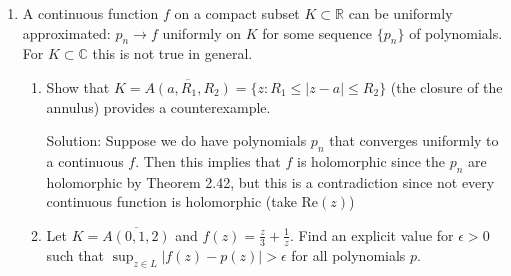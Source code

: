 \documentclass[11pt]{article}
\newcommand{\re}[0]{\text{Re}}
\newcommand{\C}{\mathbb{C}}
\newcommand{\R}{\mathbb{R}}
\begin{document}
\begin{enumerate}[(1)]
\item A continuous function $f$ on a compact subset $K \subset \R$ can be uniformly approximated: $p_n \to f$ uniformly on $K$ for some sequence $\{ p_n \}$ of polynomials. For $K \subset \C$ this is not true in general.

\begin{enumerate}
\item Show that $K = \overline{A(a, R_1, R_2)} = \{ z : R_1 \leq |z - a| \leq R_2\}$ (the closure of the annulus) provides a counterexample. 

\vspace{3mm}

Solution: Suppose we do have polynomials $p_n$ that converges uniformly to a continuous $f$. Then this implies that $f$ is holomorphic since the $p_n$ are holomorphic by Theorem 2.42, but this is a contradiction since not every continuous function is holomorphic (take $\re(z)$)


\vspace{5mm}

\item Let $K = \overline{A(0, 1, 2)}$ and $f(z) = \frac{z}{3} + \frac{1}{z}$. Find an explicit value for $\epsilon > 0$ such that $\sup_{z \in L} |f(z) - p(z)| > \epsilon$ for all polynomials $p$.




\end{enumerate}
\end{enumerate}
\end{document}
